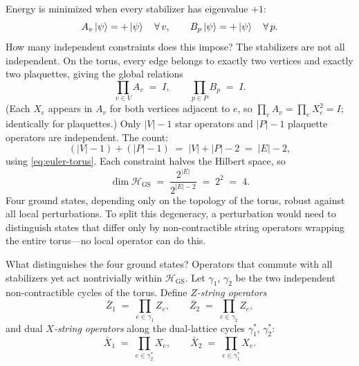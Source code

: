 Energy is minimized when every stabilizer has eigenvalue $+1$:
\begin{equation}\label{eq:gs-condition}
    A_v \left|\psi\right\rangle = +\left|\psi\right\rangle \quad \forall\, v, \qquad B_p \left|\psi\right\rangle = +\left|\psi\right\rangle \quad \forall\, p.
\end{equation}
How many independent constraints does this impose?  The stabilizers are not all independent.  On the torus, every edge belongs to exactly two vertices and exactly two plaquettes, giving the global relations
\begin{equation}\label{eq:global-constraints}
    \prod_{v \in V} A_v \;=\; I, \qquad \prod_{p \in P} B_p \;=\; I.
\end{equation}
(Each $X_e$ appears in $A_v$ for both vertices adjacent to $e$, so $\prod_v A_v = \prod_e X_e^2 = I$; identically for plaquettes.)  Only $|V| - 1$ star operators and $|P| - 1$ plaquette operators are independent.  The count:
\begin{equation}\label{eq:constraint-count}
    (|V| - 1) + (|P| - 1) \;=\; |V| + |P| - 2 \;=\; |E| - 2,
\end{equation}
using \eqref{eq:euler-torus}.  Each constraint halves the Hilbert space, so
\begin{equation}\label{eq:gsd-toric}
    \dim \mathcal{H}_{\mathrm{GS}} \;=\; \frac{2^{|E|}}{2^{|E|-2}} \;=\; 2^2 \;=\; 4.
\end{equation}
Four ground states, depending only on the topology of the torus, robust against all local perturbations.  To split this degeneracy, a perturbation would need to distinguish states that differ only by non-contractible string operators wrapping the entire torus---no local operator can do this.

What distinguishes the four ground states?  Operators that commute with all stabilizers yet act nontrivially within $\mathcal{H}_{\mathrm{GS}}$.  Let $\gamma_1$, $\gamma_2$ be the two independent non-contractible cycles of the torus.  Define \emph{$Z$-string operators}
\begin{equation}\label{eq:z-strings}
    \bar{Z}_1 \;=\; \prod_{e \in \gamma_1} Z_e, \qquad \bar{Z}_2 \;=\; \prod_{e \in \gamma_2} Z_e,
\end{equation}
and dual \emph{$X$-string operators} along the dual-lattice cycles $\gamma_1^*$, $\gamma_2^*$:
\begin{equation}\label{eq:x-strings}
    \bar{X}_1 \;=\; \prod_{e \in \gamma_2^*} X_e, \qquad \bar{X}_2 \;=\; \prod_{e \in \gamma_1^*} X_e.
\end{equation}


